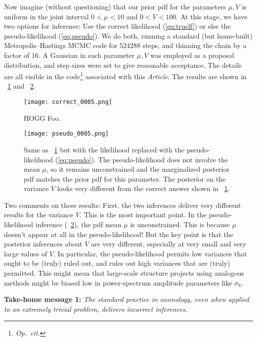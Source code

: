\documentclass[12pt, letterpaper, preprint]{aastex}
\newcommand{\foreign}[1]{\textsl{#1}}
\newcommand{\opcit}{\foreign{Op.~cit.}}
\newcommand{\documentname}{\textsl{Article}}
\begin{document}
Now imagine (without questioning) that our prior pdf for the
parameters $\mu, V$ is uniform in the joint interval $0<\mu<10$ and
$0<V<100$.
At this stage, we have two options for inference: Use the correct
likelihood (\ref{eq:truelf}) or else the pseudo-likelihood
(\ref{eq:pseudo}).
We do both, running a standard (but home-built) Metropolis--Hastings
MCMC code for $524288$ steps, and thinning the chain by a factor of
$16$.
A Gaussian in each parameter $\mu,V$ was employed as a proposal
distribution, and step sizes were set to give reasonable acceptance.
The details are all visible in the code\footnote{\opcit} associated
with this \documentname.
The results are shown in \figurename~\ref{fig:correct} and
\figurename~\ref{fig:pseudo}.%
\begin{figure}
\texttt{[image: correct\_0005.png]}
\caption{HOGG Foo.\label{fig:correct}}
\end{figure}%
\begin{figure}
\texttt{[image: pseudo\_0005.png]}
\caption{Same as \figurename~\ref{fig:correct} but with the likelihood
  replaced with the pseudo-likelihood (\ref{eq:pseudo}). The
  pseudo-likelihood does not involve the mean $\mu$, so it remains
  unconstrained and the marginalized posterior pdf matches the prior
  pdf for this parameter. The posterior on the variance $V$ looks very
  different from the correct answer shown in
  \figurename~\ref{fig:correct}.\label{fig:pseudo}}
\end{figure}

Two comments on these results:
First, the two inferences deliver very different results for the
variance $V$. This is the most important point.
In the pseudo-likelihood inference (\figurename~\ref{fig:pseudo}), the
pdf mean $\mu$ is unconstrained. This is because $\mu$ doesn't appear
at all in the pseudo-likelihood! But the key point is that the
posterior inferences about $V$ are very different, especially at very
small and very large values of $V$.
In particular, the pseudo-likelihood permits low variances that ought
to be (truly) ruled out, and rules out high variances that are (truly)
permitted. This might mean that large-scale structure projects using
analogous methods might be biased low in power-spectrum amplitude
parameters like $\sigma_8$.

\textbf{Take-home message 1:} \emph{The standard practice in
  cosmology, even when applied to an extremely trivial problem,
  delivers incorrect inferences.}
\end{document}
